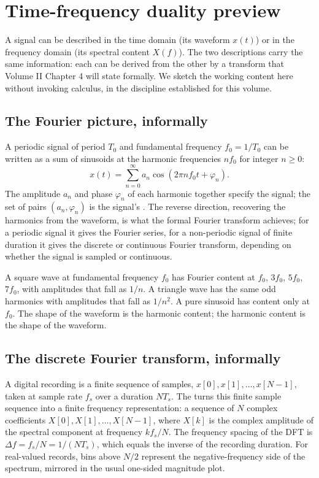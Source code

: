 \section{Time-frequency duality preview}

A signal can be described in the time domain (its waveform $x(t)$)
or in the frequency domain (its spectral content $X(f)$). The two
descriptions carry the same information: each can be derived from
the other by a transform that Volume II Chapter 4 will state
formally. We sketch the working content here without invoking
calculus, in the discipline established for this volume.

\subsection{The Fourier picture, informally}

A periodic signal of period $T_{0}$ and fundamental frequency
$f_{0} = 1/T_{0}$ can be written as a sum of sinusoids at the
harmonic frequencies $n f_{0}$ for integer $n \geq 0$:
\[
x(t) = \sum_{n=0}^{\infty} a_{n} \cos(2\pi n f_{0} t + \varphi_{n}).
\]
The amplitude $a_{n}$ and phase $\varphi_{n}$ of each harmonic
together specify the signal; the set of pairs $(a_{n}, \varphi_{n})$
is the signal's . The reverse
direction, recovering the harmonics from the waveform, is what the
formal Fourier transform achieves; for a periodic signal it gives
the Fourier series, for a non-periodic signal of finite duration it
gives the discrete or continuous Fourier transform, depending on
whether the signal is sampled or continuous.

A square wave at fundamental frequency $f_{0}$ has Fourier content
at $f_{0}$, $3 f_{0}$, $5 f_{0}$, $7 f_{0}$, with amplitudes that
fall as $1/n$. A triangle wave has the same odd harmonics with
amplitudes that fall as $1/n^{2}$. A pure sinusoid has content only
at $f_{0}$. The shape of the waveform is the harmonic content; the
harmonic content is the shape of the waveform.

\subsection{The discrete Fourier transform, informally}

A digital recording is a finite sequence of samples,
$x[0], x[1], \ldots, x[N-1]$, taken at sample rate $f_{s}$ over a
duration $N T_{s}$. The 
turns this finite sample sequence into a finite frequency
representation: a sequence of $N$ complex coefficients
$X[0], X[1], \ldots, X[N-1]$, where $X[k]$ is the complex amplitude
of the spectral component at frequency $k f_{s} / N$. The frequency
spacing of the DFT is $\Delta f = f_{s}/N = 1/(N T_{s})$, which
equals the inverse of the recording duration. For real-valued
records, bins above $N/2$ represent the negative-frequency side of
the spectrum, mirrored in the usual one-sided magnitude plot.

